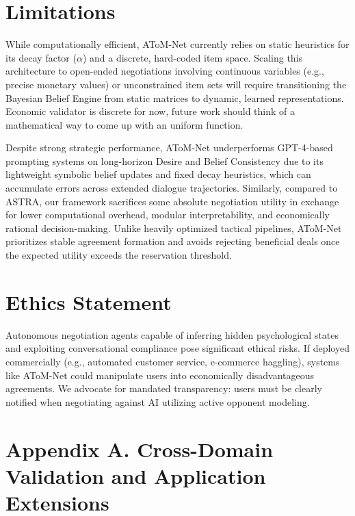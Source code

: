 \documentclass[11pt]{article}
\begin{document}
\section{Limitations}

While computationally efficient, AToM-Net currently relies on static heuristics for its decay factor ($\alpha$) and a discrete, hard-coded item space. Scaling this architecture to open-ended negotiations involving continuous variables (e.g., precise monetary values) or unconstrained item sets will require transitioning the Bayesian Belief Engine from static matrices to dynamic, learned representations. 
Economic validator is discrete for now, future work should think of a mathematical way to come up with an uniform function.

Despite strong strategic performance, AToM-Net underperforms GPT-4-based prompting systems on long-horizon Desire and Belief Consistency due to its lightweight symbolic belief updates and fixed decay heuristics, which can accumulate errors across extended dialogue trajectories. Similarly, compared to ASTRA, our framework sacrifices some absolute negotiation utility in exchange for lower computational overhead, modular interpretability, and economically rational decision-making. Unlike heavily optimized tactical pipelines, AToM-Net prioritizes stable agreement formation and avoids rejecting beneficial deals once the expected utility exceeds the reservation threshold.

\section{Ethics Statement}

Autonomous negotiation agents capable of inferring hidden psychological states and exploiting conversational compliance pose significant ethical risks. If deployed commercially (e.g., automated customer service, e-commerce haggling), systems like AToM-Net could manipulate users into economically disadvantageous agreements. We advocate for mandated transparency: users must be clearly notified when negotiating against AI utilizing active opponent modeling.





\clearpage
\appendix
\section{Appendix A. Cross-Domain Validation and Application Extensions}
\label{app:cross_domain}
\end{document}
